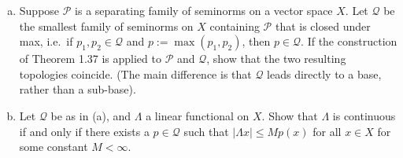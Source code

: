 \begin{exercise}[Ex.\ 1.8]
	\begin{enumerate}[(a)]
		\item Suppose $\mathscr{P}$ is a separating family of seminorms on a vector space $X$. Let $\mathscr{Q}$ be the smallest family of seminorms on $X$ containing $\mathscr{P}$ that is closed under max, i.e.\ if $p_1, p_2 \in \mathscr{Q}$ and $p := \max(p_1, p_2)$, then $p \in \mathscr{Q}$. If the construction of Theorem 1.37 is applied to $\mathscr{P}$ and $\mathscr{Q}$, show that the two resulting topologies coincide. (The main difference is that $\mathscr{Q}$ leads directly to a base, rather than a sub-base).
		
		\item Let $\mathscr{Q}$ be as in (a), and $\Lambda$ a linear functional on $X$. Show that $\Lambda$ is continuous if and only if there exists a $p \in \mathscr{Q}$ such that $|\Lambda x| \le M p(x)$ for all $x \in X$ for some constant $M < \infty$.
	\end{enumerate}
\end{exercise}

